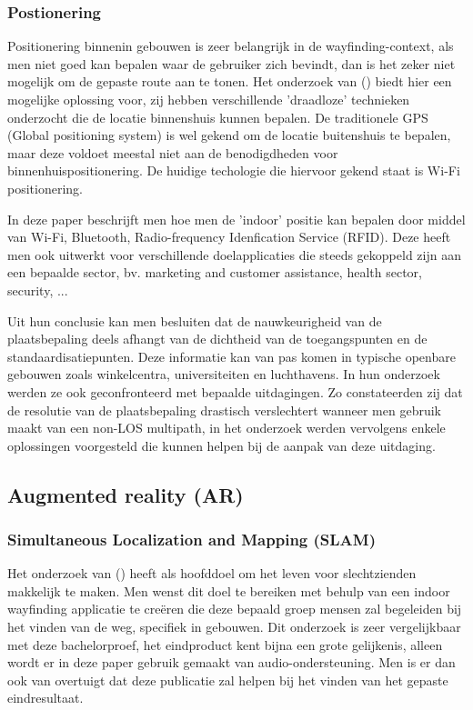 \subsubsection{Postionering}
Positionering binnenin gebouwen is zeer belangrijk in de wayfinding-context, als men niet goed kan bepalen waar de gebruiker zich bevindt, dan is het zeker niet mogelijk om de gepaste route aan te tonen. Het onderzoek van \textcite{Hasan2019} () biedt hier een mogelijke oplossing voor, zij hebben verschillende 'draadloze' technieken onderzocht die de locatie binnenshuis kunnen bepalen. De traditionele GPS (Global positioning system) is wel gekend om de locatie buitenshuis te bepalen, maar deze voldoet meestal niet aan de benodigdheden voor binnenhuispositionering. De huidige techologie die hiervoor gekend staat is Wi-Fi positionering.

In deze paper beschrijft men hoe men de 'indoor' positie kan bepalen door middel van Wi-Fi, Bluetooth, Radio-frequency Idenfication Service (RFID). Deze heeft men ook uitwerkt voor verschillende doelapplicaties die steeds gekoppeld zijn aan een bepaalde sector, bv. marketing and customer assistance, health sector, security, ...

Uit hun conclusie kan men besluiten dat de nauwkeurigheid van de plaatsbepaling deels afhangt van de dichtheid van de toegangspunten en de standaardisatiepunten. Deze informatie kan van pas komen in typische openbare gebouwen zoals winkelcentra, universiteiten en luchthavens. In hun onderzoek werden ze ook geconfronteerd met bepaalde uitdagingen. Zo constateerden zij dat de resolutie van de plaatsbepaling drastisch verslechtert wanneer men gebruik maakt van een non-LOS multipath, in het onderzoek werden vervolgens enkele oplossingen voorgesteld die kunnen helpen bij de aanpak van deze uitdaging.
 

\subsection{Augmented reality (AR)}

\subsubsection{Simultaneous Localization and Mapping (SLAM)}
Het onderzoek van \textcite{Zhang2017} () heeft als hoofddoel om het leven voor slechtzienden makkelijk te maken. Men wenst dit doel te bereiken met behulp van een indoor wayfinding applicatie te creëren die deze bepaald groep mensen zal begeleiden bij het vinden van de weg, specifiek in gebouwen. Dit onderzoek is zeer vergelijkbaar met deze bachelorproef, het eindproduct kent bijna een grote gelijkenis, alleen wordt er in deze paper gebruik gemaakt van audio-ondersteuning. Men is er dan ook van overtuigt dat deze publicatie zal helpen bij het vinden van het gepaste eindresultaat.

